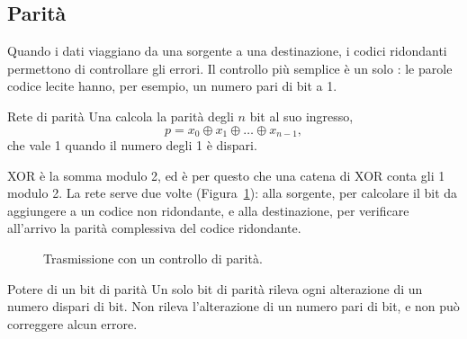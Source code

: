 \subsection{Parità}

Quando i dati viaggiano da una sorgente a una destinazione, i codici ridondanti
permettono di controllare gli errori. Il controllo più semplice è un solo
: le parole codice lecite hanno, per esempio, un numero
pari di bit a 1.

\begin{definition}{Rete di parità}
Una  calcola la parità degli $n$ bit al suo ingresso,
\[ p=x_0\oplus x_1\oplus\dots\oplus x_{n-1}, \]
che vale 1 quando il numero degli 1 è dispari.
\end{definition}

XOR è la somma modulo 2, ed è per questo che una catena di XOR conta gli 1
modulo 2. La rete serve due volte (Figura~\ref{fig:cm:parity}): alla sorgente,
per calcolare il bit da aggiungere a un codice non ridondante, e alla
destinazione, per verificare all'arrivo la parità complessiva del codice
ridondante.

\begin{figure}[htb]
\centering
{}
\caption{Trasmissione con un controllo di parità.}
\label{fig:cm:parity}
\end{figure}

\begin{theorem}{Potere di un bit di parità}
Un solo bit di parità rileva ogni alterazione di un numero dispari di bit. Non
rileva l'alterazione di un numero pari di bit, e non può correggere alcun
errore.
\end{theorem}

